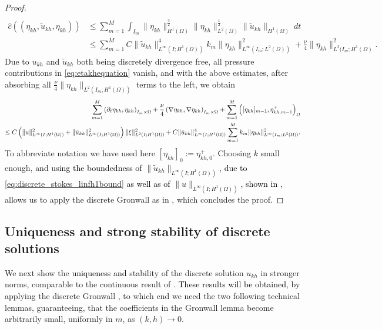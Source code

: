 \documentclass{m2an}
\newcommand\blue[1]{\textcolor{black}{#1}}
\newcommand{\ImOprod}[1]{\left( #1 \right)_{I_m\times\Omega}}
\newcommand{\Oprod}[1]{\left( #1 \right)_{\Omega}}
\newcommand{\chatIO}[1]{\hat c \left(\!\left( #1 \right)\!\right)}
\newcommand{\ukh}{u_{kh}}
\newcommand{\ukht}{\tilde u_{kh}}
\begin{document}
\begin{proof}
\begin{align*}
   \end{align*}
   \begin{align*}
      \chatIO{\eta_{kh},\ukht,\eta_{kh}} &\le \sum_{m=1}^M \int_{I_m} \|\eta_{kh}\|_{H^1(\Omega)}^{\frac{3}{2}}
      \|\eta_{kh}\|_{L^2(\Omega)}^{\frac{1}{2}} \|\ukht\|_{H^1(\Omega)}\ dt\\
      & \le \sum_{m=1}^M C\|\ukht\|_{L^\infty(I;H^1(\Omega))}^4 k_m \|\eta_{kh}\|_{L^\infty(I_m;L^2(\Omega))}^2 
      + \frac{\nu}{4} \|\eta_{kh}\|_{L^2(I_m;H^1(\Omega)}^2 .
   \end{align*}
   Due to $\ukh$ and $\ukht$ both being discretely divergence free, all pressure contributions in 
   \eqref{eq:etakhequation} vanish, and with the above estimates, after absorbing all
   $\frac{\nu}{4} \|\eta_{kh}\|_{L^2(I_m;H^1(\Omega))}$ terms to the left, we obtain
   \begin{align*}
      \sum_{m=1}^M \blue{\ImOprod{\partial_t \eta_{kh},\eta_{kh}}} + \frac{\nu}{4}
      \ImOprod{\nabla \eta_{kh},\nabla \eta_{kh}}
      + \sum_{m=1}^M \Oprod{[\eta_{kh}]_{m-1},\eta_{kh,m-1}^+}\\
      \le C\left(\|u\|_{L^\infty(I;H^1(\Omega))}^2 +\|\ukht\|_{L^\infty(I;H^1(\Omega))}^2\right)
      \|\xi\|_{L^2(I;H^1(\Omega))}^2
      + C\|\ukht\|_{L^\infty(I;H^1(\Omega))}^4 \sum_{m=1}^M k_m \|\eta_{kh}\|_{L^\infty(I_m;L^2(\Omega))}^2.
   \end{align*}
   To abbreviate notation we have used here $[\eta_{kh}]_0 := \eta_{kh,0}^+$.
   Choosing $k$ small enough,
   \blue{and using the boundedness of $\|\ukht\|_{L^\infty(I;H^1(\Omega))}$,
     due to \eqref{eq:discrete_stokes_linfh1bound} as well as 
   of $\|u\|_{L^\infty(I;H^1(\Omega))}$, shown in \Cref{thm:h2_regularity},}
   allows us to apply the discrete Gronwall \blue{} as in 
   , which concludes the proof.
\end{proof}

\subsection{Uniqueness and strong stability of discrete solutions}

We next show the \blue{uniqueness and } stability of the discrete solution $\ukh$ in stronger norms,
comparable to the continuous result of .
\blue{These results will be obtained},
by applying the discrete Gronwall ,
to which end we need the two following technical lemmas, guaranteeing, that the coefficients
in the Gronwall lemma become arbitrarily small, uniformly in $m$, as $(k,h) \to 0$.
\end{document}
